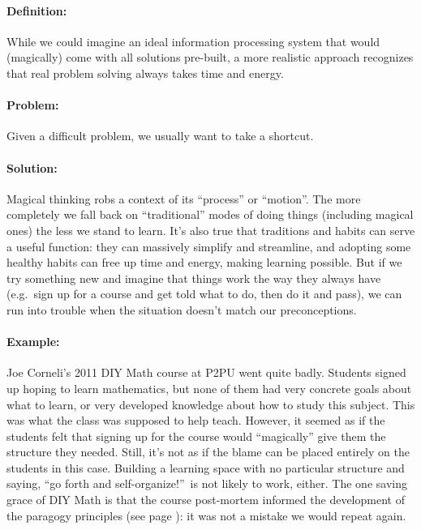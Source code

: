 \paragraph{Definition:} While we could imagine an ideal information
processing system that would (magically) come with all solutions
pre-built, a more realistic approach recognizes that real problem
solving always takes time and energy.

\paragraph{Problem:} Given a difficult problem, we usually want to take a
shortcut.

\paragraph{Solution:} Magical thinking robs a context of its ``process'' or
``motion''. The more completely we fall back on ``traditional'' modes of
doing things (including magical ones) the less we stand to learn. It's
also true that traditions and habits can serve a useful function: they
can massively simplify and streamline, and adopting some healthy habits
can free up time and energy, making learning possible. But if we try
something new and imagine that things work the way they always have
(e.g.~sign up for a course and get told what to do, then do it and
pass), we can run into trouble when the situation doesn't match our
preconceptions.

\paragraph{Example:} Joe Corneli's 2011 DIY Math course at P2PU went quite
badly. Students signed up hoping to learn mathematics, but none of them
had very concrete goals about what to learn, or very developed knowledge
about how to study this subject. This was what the class was supposed to
help teach. However, it seemed as if the students felt that signing up
for the course would ``magically'' give them the structure they needed.
Still, it's not as if the blame can be placed entirely on the students
in this case. Building a learning space with no particular structure and
saying, ``go forth and self-organize!''~is not likely to work, either.
The one saving grace of DIY Math is that the course post-mortem informed
the development of the paragogy principles (see page \pageref{paragogy-principles}): it was not a mistake we
would repeat again.

